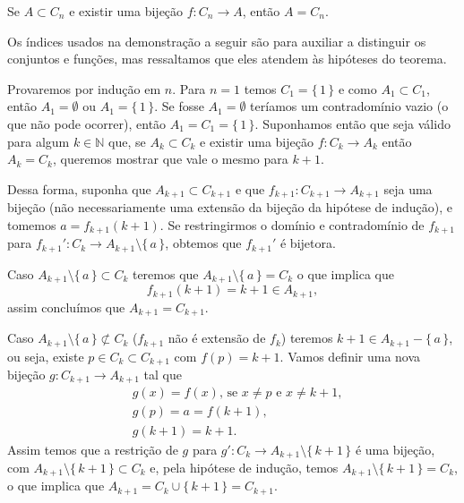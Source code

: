 \documentclass[../main.tex]{subfiles}
\begin{document}
\begin{teo}\label{enum-teo-bijecaoACn}
    Se $A \subset C_n$ e existir uma bijeção $f \colon C_n \to A$, então $A = C_n$.
\end{teo}
\begin{dem}
    Os índices usados na demonstração a seguir são para auxiliar a distinguir os conjuntos e funções, mas ressaltamos que eles atendem às hipóteses do teorema.
    
    Provaremos por indução em $n$. Para $n = 1$ temos $C_1 = \{\,1\,\}$ e como $A_1 \subset C_1$, então $A_1 = \emptyset $ ou $ A_1 = \{\,1\,\}$. Se fosse $A_1 = \emptyset$ teríamos um contradomínio vazio (o que não pode ocorrer), então $A_1 = C_1 = \{\,1\,\}$. Suponhamos então que seja válido para algum $k \in \mathbb{N}$ que, se $A_k \subset C_k $ e existir uma bijeção $f \colon C_k \to A_k$ então $A_k = C_k$, queremos mostrar que vale o mesmo para $k+1$.

    Dessa forma, suponha que $A_{k+1} \subset C_{k+1}$ e que $f_{k+1} \colon C_{k+1} \to A_{k+1}$ seja uma bijeção (não necessariamente uma extensão da bijeção da hipótese de indução), e tomemos $a = f_{k+1}(k+1)$. Se restringirmos o domínio e contradomínio de $f_{k+1}$ para 
    $f_{k+1}' \colon C_k \to A_{k+1} \setminus \{\,a\,\}$, obtemos que $f_{k+1}'$ é bijetora.

    Caso $A_{k+1} \setminus \{\,a\,\} \subset C_k$ teremos que $A_{k+1} \setminus \{\,a\,\} = C_k$ o que implica que
    \[ f_{k+1}(k+1) = k+1 \in A_{k+1},\] 
    assim concluímos que $A_{k+1} = C_{k+1}$. 
    
    Caso $A_{k+1} \setminus \{\,a\,\} \not\subset C_k$ ($f_{k+1}$ não é extensão de $f_k$)
    teremos $k+1 \in A_{k+1} - \{\,a\,\}$, ou seja, existe $p \in C_{k} \subset C_{k+1}$ com $f(p) = k+1$. Vamos definir uma nova bijeção 
    $g \colon C_{k+1} \to A_{k+1} $ tal que
    \begin{align*}
        &g(x) = f(x) \text{, se } x \neq p \text{ e } x \neq k+1, \\
        &g(p) = a = f(k+1), \\
        &g(k+1) = k+1.
    \end{align*}
    Assim temos que a restrição de $g$ para $g' \colon C_k \to A_{k+1} \setminus \{\,k+1\,\}$ é uma bijeção, com $A_{k+1} \setminus \{\,k+1\,\} \subset C_k$ e, pela hipótese de indução, temos $A_{k+1} \setminus \{\,k+1\,\} = C_k$, o que implica que $A_{k+1} = C_k \cup \{\,k+1\,\} = C_{k+1}$. 
    
\end{dem}
\end{document}
